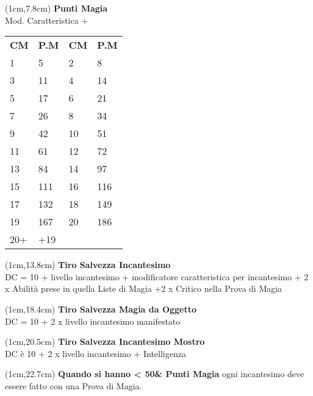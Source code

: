\documentclass[a4paper,12 pt,openany]{book}
\begin{document}
{\footnotesize
\begin{textblock*}{5cm}(1cm,7.8cm) %
\textbf{Punti Magia}\\
Mod. Caratteristica + \\
\begin{tabular}{ll|ll}
\textbf{CM} & \textbf{P.M}&	\textbf{CM} & \textbf{P.M}\\
1 &5 &2&8 \\
3&11&4&14\\
5&17&6&21\\
7&26&8&34\\
9&42&10&51\\
11&61&12&72\\
13&84&14&97\\
15&111&16&116\\
17&132&18&149\\
19&167&20&186\\
20+&+19&&\\
	\hline
\end{tabular}
\end{textblock*} }

\begin{textblock*}{5cm}(1cm,13.8cm) %
\textbf{Tiro Salvezza Incantesimo}\\
DC = 10 + livello incantesimo + modificatore caratteristica per incantesimo + 2 x Abilità prese in quella Liste di Magia +2 x Critico nella Prova di Magia
\end{textblock*}

\begin{textblock*}{5cm}(1cm,18.4cm) %
\textbf{Tiro Salvezza Magia da Oggetto}\\
DC = 10 + 2 x livello incantesimo manifestato
\end{textblock*}

\begin{textblock*}{5cm}(1cm,20.5cm) %
	\textbf{Tiro Salvezza Incantesimo Mostro}\\
DC è 10 + 2 x livello incantesimo + Intelligenza
\end{textblock*}

\begin{textblock*}{5cm}(1cm,22.7cm) %
{\small
\textbf{Quando si hanno < 50\& Punti Magia} ogni incantesimo deve essere fatto con una Prova di Magia.}
\end{textblock*}
\end{document}
